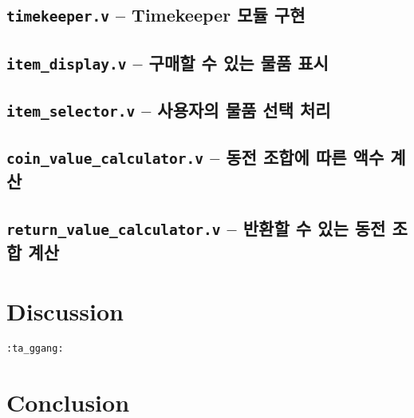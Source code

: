 \documentclass{scrartcl}
\begin{document}
\subsection{\texttt{timekeeper.v} -- Timekeeper 모듈 구현}

\subsection{\texttt{item\_display.v} -- 구매할 수 있는 물품 표시}

\subsection{\texttt{item\_selector.v} -- 사용자의 물품 선택 처리}

\subsection{\texttt{coin\_value\_calculator.v} -- 동전 조합에 따른 액수 계산}

\subsection{\texttt{return\_value\_calculator.v} -- 반환할 수 있는 동전 조합 계산}

\section{Discussion}
\texttt{:ta\_ggang:} %

\section{Conclusion}
\end{document}
